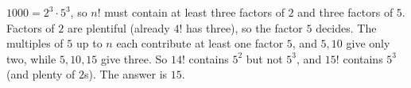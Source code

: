 $1000=2^3\cdot5^3$, so $n!$ must contain at least three factors of $2$ and three factors of $5$. Factors of $2$ are plentiful (already $4!$ has three), so the factor $5$ decides. The multiples of $5$ up to $n$ each contribute at least one factor $5$, and $5,10$ give only two, while $5,10,15$ give three. So $14!$ contains $5^2$ but not $5^3$, and $15!$ contains $5^3$ (and plenty of $2$s). The answer is $\boxed{15}$.
